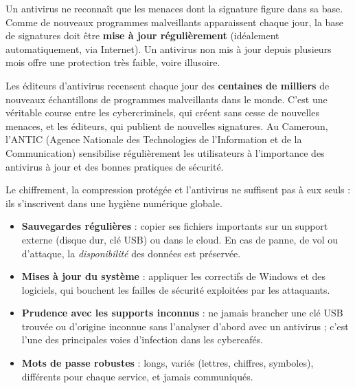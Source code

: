 \documentclass[11pt]{article}
\newcounter{popsec}
\newcounter{popsub}
\newcommand{\courssub}[1]{%
  \stepcounter{popsub}%
  \par\vspace{9pt}\noindent{\popxbold\fontsize{11.5}{13}\selectfont\color{popink}{\color{poporange}\thepopsec.\thepopsub}\hspace{6pt}#1}\par\nopagebreak\vspace{4pt}
}
\begin{document}
\begin{propriete}
Un antivirus ne reconnaît que les menaces dont la signature figure dans sa base. Comme de nouveaux programmes malveillants apparaissent chaque jour, la base de signatures doit être \textbf{mise à jour régulièrement} (idéalement automatiquement, via Internet). Un antivirus non mis à jour depuis plusieurs mois offre une protection très faible, voire illusoire.
\end{propriete}

\begin{savaistu}
Les éditeurs d'antivirus recensent chaque jour des \textbf{centaines de milliers} de nouveaux échantillons de programmes malveillants dans le monde. C'est une véritable course entre les cybercriminels, qui créent sans cesse de nouvelles menaces, et les éditeurs, qui publient de nouvelles signatures. Au Cameroun, l'ANTIC (Agence Nationale des Technologies de l'Information et de la Communication) sensibilise régulièrement les utilisateurs à l'importance des antivirus à jour et des bonnes pratiques de sécurité.
\end{savaistu}

\courssub{Bonnes pratiques associées}

Le chiffrement, la compression protégée et l'antivirus ne suffisent pas à eux seuls : ils s'inscrivent dans une hygiène numérique globale.

\begin{itemize}
  \item \textbf{Sauvegardes régulières} : copier ses fichiers importants sur un support externe (disque dur, clé USB) ou dans le cloud. En cas de panne, de vol ou d'attaque, la \emph{disponibilité} des données est préservée.
  \item \textbf{Mises à jour du système} : appliquer les correctifs de Windows et des logiciels, qui bouchent les failles de sécurité exploitées par les attaquants.
  \item \textbf{Prudence avec les supports inconnus} : ne jamais brancher une clé USB trouvée ou d'origine inconnue sans l'analyser d'abord avec un antivirus ; c'est l'une des principales voies d'infection dans les cybercafés.
  \item \textbf{Mots de passe robustes} : longs, variés (lettres, chiffres, symboles), différents pour chaque service, et jamais communiqués.
\end{itemize}
\end{document}
